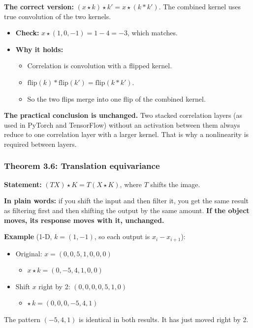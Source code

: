 \textbf{The correct version:} $(x \star k) \star k' = x \star (k * k')$. The combined kernel uses true convolution of the two kernels.
\begin{itemize}
  \item \textbf{Check:} $x \star (1, 0, -1) = 1 - 4 = -3$, which matches.
  \item \textbf{Why it holds:}
  \begin{itemize}
    \item Correlation is convolution with a flipped kernel.
    \item $\mathrm{flip}(k) * \mathrm{flip}(k') = \mathrm{flip}(k * k')$.
    \item So the two flips merge into one flip of the combined kernel.
  \end{itemize}
\end{itemize}
\textbf{The practical conclusion is unchanged.} Two stacked correlation layers (as used in PyTorch and TensorFlow) without an activation between them always reduce to one correlation layer with a larger kernel. That is why a nonlinearity is required between layers.

\subsubsection*{Theorem 3.6: Translation equivariance}

\textbf{Statement:} $(T X) \star K = T (X \star K)$, where $T$ shifts the image.

\textbf{In plain words:} if you shift the input and then filter it, you get the same result as filtering first and then shifting the output by the same amount. \textbf{If the object moves, its response moves with it, unchanged.}

\textbf{Example} (1-D, $k = (1, -1)$, so each output is $x_i - x_{i+1}$):
\begin{itemize}
  \item Original: $x = (0, 0, 5, 1, 0, 0, 0)$
  \begin{itemize}
    \item $x \star k = (0, -5, 4, 1, 0, 0)$
  \end{itemize}
  \item Shift $x$ right by 2: $(0, 0, 0, 0, 5, 1, 0)$
  \begin{itemize}
    \item $\star\, k = (0, 0, 0, -5, 4, 1)$
  \end{itemize}
\end{itemize}
The pattern $(-5, 4, 1)$ is identical in both results. It has just moved right by 2.

